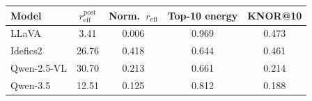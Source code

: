 \begin{tabular}{lcccc}
\toprule
Model & $r_{\mathrm{eff}}^{\mathrm{post}}$ & Norm.\ $r_{\mathrm{eff}}$ & Top-10 energy & KNOR@10 \\
\midrule
LLaVA & 3.41 & 0.006 & 0.969 & 0.473 \\
Idefics2 & 26.76 & 0.418 & 0.644 & 0.461 \\
Qwen-2.5-VL & 30.70 & 0.213 & 0.661 & 0.214 \\
Qwen-3.5 & 12.51 & 0.125 & 0.812 & 0.188 \\
\bottomrule
\end{tabular}